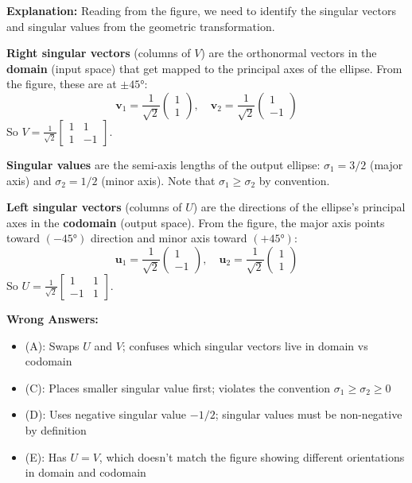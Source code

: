 \documentclass[12pt]{amsart}
\begin{document}
\textbf{Explanation:} Reading from the figure, we need to identify the singular vectors and singular values from the geometric transformation.

\textbf{Right singular vectors} (columns of $V$) are the orthonormal vectors in the \textbf{domain} (input space) that get mapped to the principal axes of the ellipse. From the figure, these are at $\pm 45°$:
$$\mathbf{v}_1 = \frac{1}{\sqrt{2}}\begin{pmatrix} 1 \\ 1 \end{pmatrix}, \quad \mathbf{v}_2 = \frac{1}{\sqrt{2}}\begin{pmatrix} 1 \\ -1 \end{pmatrix}$$
So $V = \frac{1}{\sqrt{2}}\begin{bmatrix} 1 & 1 \\ 1 & -1 \end{bmatrix}$.

\textbf{Singular values} are the semi-axis lengths of the output ellipse: $\sigma_1 = 3/2$ (major axis) and $\sigma_2 = 1/2$ (minor axis). Note that $\sigma_1 \geq \sigma_2$ by convention.

\textbf{Left singular vectors} (columns of $U$) are the directions of the ellipse's principal axes in the \textbf{codomain} (output space). From the figure, the major axis points toward $(-45°)$ direction and minor axis toward $(+45°)$:
$$\mathbf{u}_1 = \frac{1}{\sqrt{2}}\begin{pmatrix} 1 \\ -1 \end{pmatrix}, \quad \mathbf{u}_2 = \frac{1}{\sqrt{2}}\begin{pmatrix} 1 \\ 1 \end{pmatrix}$$
So $U = \frac{1}{\sqrt{2}}\begin{bmatrix} 1 & 1 \\ -1 & 1 \end{bmatrix}$.

\textbf{Wrong Answers:}
\begin{itemize}
\item (A): Swaps $U$ and $V$; confuses which singular vectors live in domain vs codomain
\item (C): Places smaller singular value first; violates the convention $\sigma_1 \geq \sigma_2 \geq 0$
\item (D): Uses negative singular value $-1/2$; singular values must be non-negative by definition
\item (E): Has $U = V$, which doesn't match the figure showing different orientations in domain and codomain
\end{itemize}
\end{document}

